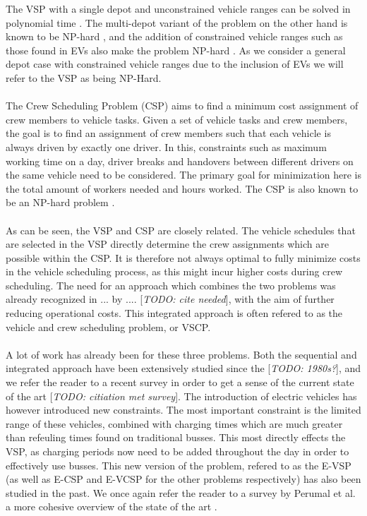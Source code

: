 \documentclass[]{article}
\newcommand{\todo}[1]{{\color{red}[\textit{TODO: #1}]}}
\begin{document}
The VSP with a single depot and unconstrained vehicle ranges can be solved in polynomial time \cite{Freling2003SDVSP}. The multi-depot variant of the problem on the other hand is known to be NP-hard \cite{BODIN198363, Bertossi1987, Even1975}, and the addition of constrained vehicle ranges such as those found in EVs also make the problem NP-hard \cite{BODIN198363, Sassi2014}. As we consider a general depot case with constrained vehicle ranges due to the inclusion of EVs we will refer to the VSP as being NP-Hard. \\\\ 
The Crew Scheduling Problem (CSP) aims to find a minimum cost assignment of crew members to vehicle tasks. Given a set of vehicle tasks and crew members, the goal is to find an assignment of crew members such that each vehicle is always driven by exactly one driver. In this, constraints such as maximum working time on a day, driver breaks and handovers between different drivers on the same vehicle need to be considered. The primary goal for minimization here is the total amount of workers needed and hours worked. The CSP is also known to be an NP-hard problem \cite{Fischetti1989}.\\\\
As can be seen, the VSP and CSP are closely related. The vehicle schedules that are selected in the VSP directly determine the crew assignments which are possible within the CSP. It is therefore not always optimal to fully minimize costs in the vehicle scheduling process, as this might incur higher costs during crew scheduling. The need for an approach which combines the two problems was already recognized in ... by .... \todo{cite needed}, with the aim of further reducing operational costs. This integrated approach is often refered to as the vehicle and crew scheduling problem, or VSCP. \\\\
A lot of work has already been for these three problems. Both the sequential and integrated approach have been extensively studied since the \todo{1980s?}, and we refer the reader to a recent survey in order to get a sense of the current state of the art \todo{citiation met survey}. The introduction of electric vehicles has however introduced new constraints. The most important constraint is the limited range of these vehicles, combined with charging times which are much greater than refeuling times found on traditional busses. This most directly effects the VSP, as charging periods now need to be added throughout the day in order to effectively use busses. This new version of the problem, refered to as the E-VSP (as well as E-CSP and E-VCSP for the other problems respectively) has also been studied in the past. We once again refer the reader to a survey by Perumal et al. a more cohesive overview of the state of the art \cite{PERUMAL2022395}. \\\\
\end{document}
